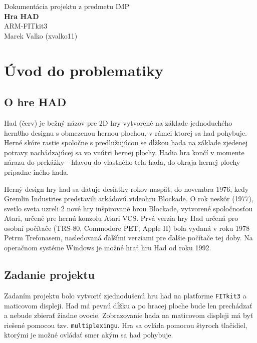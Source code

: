 \documentclass[a4paper, 11pt]{article}
\begin{document}
\thispagestyle{empty}
\begin{center}
\begin{figure}[h]
\centering
{}
\end{figure}
\LARGE Dokumentácia projektu z predmetu IMP\\
\LARGE \textbf{Hra HAD}\\
\LARGE ARM-FITkit3\\
\Large \hfill Marek Valko (xvalko11)\\
\pagebreak
\end{center}

\tableofcontents
\pagebreak

\section{Úvod do problematiky}
\subsection{O hre HAD}
Had (červ) je bežný názov pre 2D hry vytvorené na základe jednoduchého hern0ho designu s obmezenou hernou plochou, v rámci ktorej sa had pohybuje. Herné skóre rastie spoločne s predlužujúcou se dĺžkou hada na základe zjedenej potravy nachádzajúcej sa vo vnútri hernej plochy. Hadia hra končí v momente nárazu do prekážky - hlavou do vlastného tela hada, do okraja hernej plochy prípadne iného hada.

Herný design hry had sa datuje desiatky rokov naspäť, do novembra 1976, kedy Gremlin Industries predstavili arkádovú videohru Blockade. O rok neskôr (1977), svetlo sveta uzreli 2 nové hry inšpirované hrou Blockade, vytvorené spoločnosťou Atari, určené pre hernú konzolu Atari VCS. Prvá verzia hry Had určená pro osobní počítače (TRS-80, Commodore PET, Apple II) bola vydaná v roku 1978 Petrm Trefonasem, nasledovaná ďalšími verziami pre ďalšie počítače tej doby. Na operačnom systéme Windows je možné hrať hru Had od roku 1992.

\subsection{Zadanie projektu}
Zadaním projektu bolo vytvoriť zjednodušenú hru had na platforme \texttt{FITkit3} a maticovom displeji. Had má pevnú dĺžku a po hracej ploche bude len prechádzať a nebude zbierať žiadne ovocie. Zobrazovanie hada na maticovom displeji má byť riešené pomocou tzv. \texttt{multiplexingu}. Hra sa ovláda pomocou štyroch tlačidiel, ktorými je možné ovládať smer akým sa had pohybuje.
\end{document}
